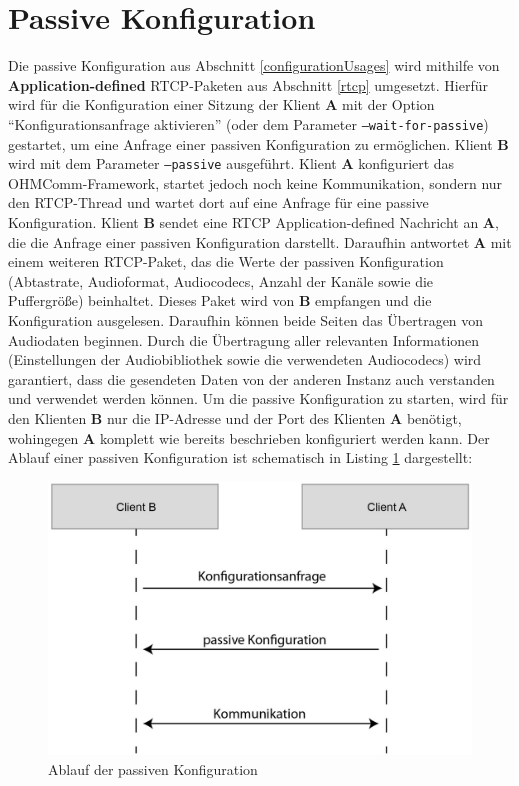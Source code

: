 \FloatBarrier
\section{Passive Konfiguration}
\label{passiveConfiguration}
Die passive Konfiguration aus Abschnitt \ref{configurationUsages} wird mithilfe von \textbf{Application-defined} RTCP-Paketen aus Abschnitt \ref{rtcp} umgesetzt. Hierfür wird für die Konfiguration einer Sitzung der Klient \textbf{A} mit der Option \enquote{Konfigurationsanfrage aktivieren} (oder dem Parameter \texttt{--wait-for-passive}) gestartet, um eine Anfrage einer passiven Konfiguration zu ermöglichen. Klient \textbf{B} wird mit dem Parameter \texttt{--passive} ausgeführt. Klient \textbf{A} konfiguriert das OHMComm-Framework, startet jedoch noch keine Kommunikation, sondern nur den RTCP-Thread und wartet dort auf eine Anfrage für eine passive Konfiguration. Klient \textbf{B} sendet eine RTCP Application-defined Nachricht an \textbf{A}, die die Anfrage einer passiven Konfiguration darstellt. Daraufhin antwortet \textbf{A} mit einem weiteren RTCP-Paket, das die Werte der passiven Konfiguration (Abtastrate, Audioformat, Audiocodecs, Anzahl der Kanäle sowie die Puffergröße) beinhaltet. Dieses Paket wird von \textbf{B} empfangen und die Konfiguration ausgelesen. Daraufhin können beide Seiten das Übertragen von Audiodaten beginnen. Durch die Übertragung aller relevanten Informationen (Einstellungen der Audiobibliothek sowie die verwendeten Audiocodecs) wird garantiert, dass die gesendeten Daten von der anderen Instanz auch verstanden und verwendet werden können. Um die passive Konfiguration zu starten, wird für den Klienten \textbf{B} nur die IP-Adresse und der Port des Klienten \textbf{A} benötigt, wohingegen \textbf{A} komplett wie bereits beschrieben konfiguriert werden kann. Der Ablauf einer passiven Konfiguration ist schematisch in Listing \ref{lst:passiveConfiguration} dargestellt:
\newline
\begin{figure}[htp]
\centering
\includegraphics[width=.75\textwidth]{../img/passiveConfiguration}
\caption{Ablauf der passiven Konfiguration}
\label{lst:passiveConfiguration}
\end{figure}

